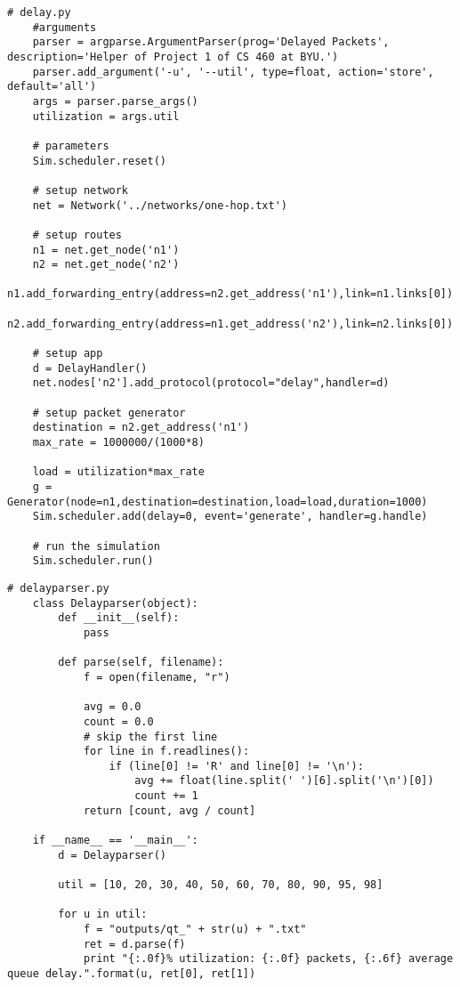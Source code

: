 \documentclass[11pt]{article}
\begin{document}
\vspace{5mm}
\begin{absolutelynopagebreak}
\begin{lstlisting}
# delay.py
    #arguments
    parser = argparse.ArgumentParser(prog='Delayed Packets', description='Helper of Project 1 of CS 460 at BYU.')
    parser.add_argument('-u', '--util', type=float, action='store', default='all')
    args = parser.parse_args()
    utilization = args.util

    # parameters
    Sim.scheduler.reset()

    # setup network
    net = Network('../networks/one-hop.txt')

    # setup routes
    n1 = net.get_node('n1')
    n2 = net.get_node('n2')
    n1.add_forwarding_entry(address=n2.get_address('n1'),link=n1.links[0])
    n2.add_forwarding_entry(address=n1.get_address('n2'),link=n2.links[0])

    # setup app
    d = DelayHandler()
    net.nodes['n2'].add_protocol(protocol="delay",handler=d)

    # setup packet generator
    destination = n2.get_address('n1')
    max_rate = 1000000/(1000*8)

    load = utilization*max_rate
    g = Generator(node=n1,destination=destination,load=load,duration=1000)
    Sim.scheduler.add(delay=0, event='generate', handler=g.handle)
    
    # run the simulation
    Sim.scheduler.run()
\end{lstlisting}
\end{absolutelynopagebreak}

\vspace{5mm}

\begin{absolutelynopagebreak}
\begin{lstlisting}
# delayparser.py
    class Delayparser(object):
        def __init__(self):
            pass

        def parse(self, filename):
            f = open(filename, "r")

            avg = 0.0
            count = 0.0
            # skip the first line
            for line in f.readlines():
                if (line[0] != 'R' and line[0] != '\n'):
                    avg += float(line.split(' ')[6].split('\n')[0])
                    count += 1
            return [count, avg / count]

    if __name__ == '__main__':
        d = Delayparser()

        util = [10, 20, 30, 40, 50, 60, 70, 80, 90, 95, 98]

        for u in util:
            f = "outputs/qt_" + str(u) + ".txt"
            ret = d.parse(f)
            print "{:.0f}% utilization: {:.0f} packets, {:.6f} average queue delay.".format(u, ret[0], ret[1])
\end{lstlisting}
\end{absolutelynopagebreak}
\end{document}
